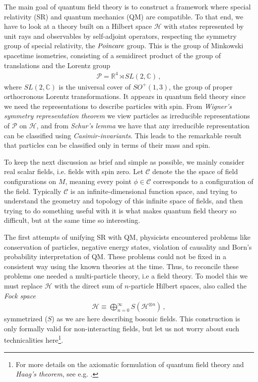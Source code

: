 The main goal of quantum field theory is to construct a framework where special relativity (SR) and quantum mechanics (QM) are compatible. To that end, we have to look at a theory built on a Hilbert space $\mathcal{H}$ with states represented by unit rays and observables by self-adjoint operators, respecting the symmetry group of special relativity, the $\emph{Poincare}$ group. This is the group of Minkowski spacetime isometries, consisting of a semidirect product of the group of translations and the Lorentz group
\begin{align}
    \mathcal{P}=\mathbb{R}^{4}\rtimes SL(2,\mathbb{C})\,,
\end{align}
where $SL(2,\mathbb{C})$ is the universal cover of $SO^{+}(1,3)$, the group of proper orthocronous Lorentz transformations. It appears in quantum field theory since we need the representations to describe particles with spin. From \emph{Wigner's symmetry representation theorem} we view particles as irreducible representations of $\mathcal{P}$ on $\mathcal{H}$, and from \emph{Schur's lemma} we have that any irreducible representation can be classified using \emph{Casimir-invariants}. This leads to the remarkable result that particles can be classified only in terms of their mass and spin. 

To keep the next discussion as brief and simple as possible, we mainly consider real scalar fields, i.e. fields with spin zero. Let $\mathcal{C}$ denote the the space of field configurations on $M$, meaning every point $\phi\in \mathcal{C}$ corresponds to a configuration of the field. Typically $\mathcal{C}$ is an infinite-dimensional function space, and trying to understand the geometry and topology of this infinite space of fields, and then trying to do something useful with it is what makes quantum field theory so difficult, but at the same time so interesting. 


The first attempts of unifying SR with QM, physicists encountered problems like conservation of particles, negative energy states, violation of causality and Born's probability interpretation of QM. These problems could not be fixed in a consistent way using the known theories at the time. Thus, to reconcile these problems one needed a multi-particle theory, i.e a field theory.
To model this we must replace $\mathcal{H}$ with the direct sum of $n$-particle Hilbert spaces, also called the \emph{Fock space}
\begin{align}\label{eq:Fock space}
    \mathcal{H}\equiv\bigoplus_{n=0}^{\infty}S(\mathcal{H}^{\otimes n})\,,
\end{align}
symmetrized ($S$) as we are here describing bosonic fields. This construction is only formally valid for non-interacting fields, but let us not worry about such technicalities here\footnote{For more details on the axiomatic formulation of quantum field theory and \emph{Haag's theorem}, see e.g. \cite{inbook,klaczynski2016haags}.}. 

